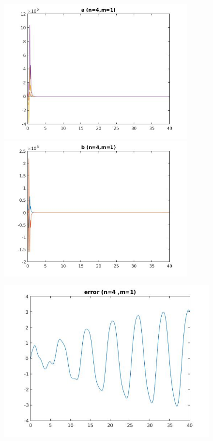 \documentclass{article}
\begin{document}
\clearpage
\large
\begin{figure}[h!]
\centering 
 	  \begin{minipage}{0.48\textwidth}
     \centering
     \advance\leftskip-4cm
  \includegraphics[width=100mm,scale=2]{assets/try41o.jpg}
   \end{minipage} \hfill
    \begin{minipage}{0.48\textwidth}
  \includegraphics[width=100mm,scale=2]{assets/try41oo.jpg}
  \end{minipage}
\end{figure}
\begin{figure}[h!]
\centering
\advance\leftskip-0.5cm
 \includegraphics[width=140mm,scale=2]{assets/try41ooo.jpg}
\end{figure}
\end{document}
